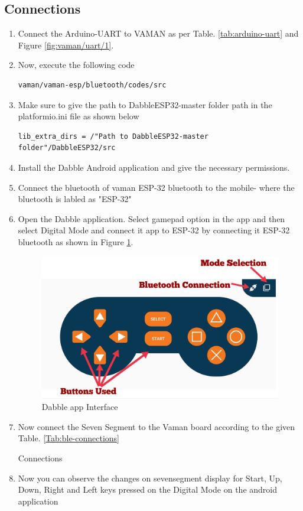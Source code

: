 \subsection{Connections}
\begin{enumerate}[label=\thesection.\arabic*.,ref=\thesection.\theenumi]
\item Connect the Arduino-UART to VAMAN as per Table. \ref{tab:arduino-uart} and Figure \ref{fig:vaman/uart/1}.
  \item Now, execute the following code
\begin{lstlisting}
vaman/vaman-esp/bluetooth/codes/src
\end{lstlisting}
\item Make sure to give the path to DabbleESP32-master folder path in the platformio.ini file as shown below
\begin{lstlisting}
lib_extra_dirs = /"Path to DabbleESP32-master folder"/DabbleESP32/src
\end{lstlisting}
\item Install the Dabble Android application and give the necessary permissions.
\item Connect the bluetooth of vaman ESP-32 bluetooth to the mobile- where the bluetooth is labled as "ESP-32"
\item Open the Dabble application. Select gamepad option in the app and then select Digital Mode and connect it app to ESP-32 by connecting it ESP-32 bluetooth as shown in Figure \ref{fig:ble_app}.
\begin{figure}[!ht]
\centering
\includegraphics[width=\columnwidth]{./vaman/vaman-esp/bluetooth/figs/ble_app.jpg}
\caption{Dabble app Interface}
\label{fig:ble_app}
\end{figure}
\item Now connect the Seven Segment to the Vaman board according to the given Table. \ref{Tab:ble-connections}
\begin{table}[!ht]
\centering

\caption{Connections}
\label{Tab:ble-connections}
\end{table}
\item Now you can observe the changes on sevensegment display for Start, Up, Down, Right and Left keys pressed on the Digital Mode on the android application
\end{enumerate}
